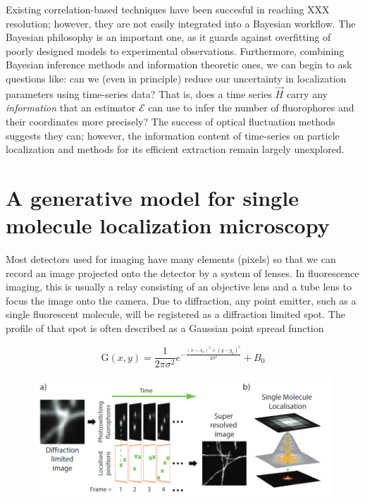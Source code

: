 \documentclass{ucetd}
\begin{document}
Existing correlation-based techniques have been succesful in reaching XXX resolution; however, they are not easily integrated into a Bayesian workflow. The Bayesian philosophy is an important one, as it guards against overfitting of poorly designed models to experimental observations. Furthermore, combining Bayesian inference methods and information theoretic ones, we can begin to ask questions like: can we (even in principle) reduce our uncertainty in localization parameters using time-series data? That is, does a time series $\vec{H}$ carry any \emph{information} that an estimator $\mathcal{E}$ can use to infer the number of fluorophores and their coordinates more precisely? The success of optical fluctuation methods suggests they can; however, the information content of time-series on particle localization and methods for its efficient extraction remain largely unexplored. 

\section{A generative model for single molecule localization microscopy}

Most detectors used for imaging have many elements (pixels) so that we can record an image projected onto the detector by a system of lenses. In fluorescence imaging, this is usually a relay consisting of an objective lens and a tube lens to focus the image onto the camera. Due to diffraction, any point emitter, such as a single fluorescent molecule, will be registered as a diffraction limited spot. The profile of that spot is often described as a Gaussian point spread function

\begin{equation}
\mathrm{G}(x,y) = \frac{1}{2\pi\sigma^{2}}e^{-\frac{(x-x_{0})^{2}+(y-y_{0})^{2}}{2\sigma^{2}}} + B_0
\end{equation}

\begin{figure}
\includegraphics[scale=0.525]{Figure-0.png}
\end{figure}
\end{document}
